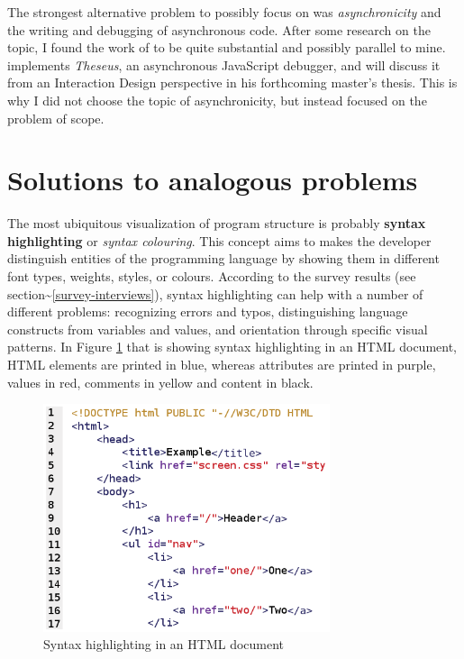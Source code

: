The strongest alternative problem to possibly focus on was
\emph{asynchronicity} and the writing and debugging of asynchronous
code. After some research on the topic, I found the work of
 to be quite substantial and possibly parallel to
mine.  implements \emph{Theseus}, an asynchronous
JavaScript debugger, and will discuss it from an Interaction Design
perspective in his forthcoming master’s thesis. This is why I did not
choose the topic of asynchronicity, but instead focused on the problem
of scope.

\section{Solutions to analogous
problems}\label{solutions-to-analogous-problems}

The most ubiquitous visualization of program structure is probably
\textbf{syntax highlighting} or \emph{syntax colouring}. This concept
aims to makes the developer distinguish entities of the programming
language by showing them in different font types, weights, styles, or
colours. According to the survey results (see
section\textasciitilde{}\ref{survey-interviews}), syntax highlighting
can help with a number of different problems: recognizing errors and
typos, distinguishing language constructs from variables and values, and
orientation through specific visual patterns. In Figure
\ref{fig:syntaxhighlighting} that is showing syntax highlighting in an
HTML document, HTML elements are printed in blue, whereas attributes are
printed in purple, values in red, comments in yellow and content in
black.

\begin{figure}[htbp]
\centering
\includegraphics[keepaspectratio,width=0.75\textwidth,height=0.75\textheight]{img/syntax_highlighting.png}
\caption{Syntax highlighting in an HTML document}
\label{fig:syntaxhighlighting}
\end{figure}

